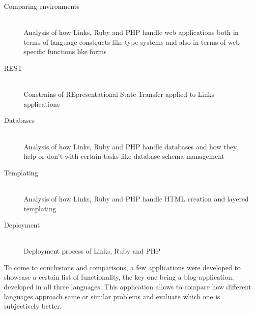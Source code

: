 \begin{description}
  \item[Comparing environments] \hfill \\
  Analysis of how Links, Ruby and PHP handle web applications both in terms of language constructs like type systems and also in terms of web-specific functions like forms
  \item[REST] \hfill \\
  Constrains of REpresentational State Transfer applied to Links applications
  \item[Databases] \hfill \\
  Analysis of how Links, Ruby and PHP handle databases and how they help or don't with certain tasks like database schema management
  \item[Templating] \hfill \\
  Analysis of how Links, Ruby and PHP handle HTML creation and layered templating
  \item[Deployment] \hfill \\
  Deployment process of Links, Ruby and PHP
\end{description}

To come to conclusions and comparisons, a few applications were developed to showcase a certain list of functionality, the key one being a blog application, developed in all three languages. This application allows to compare how different languages approach same or similar problems and evaluate which one is subjectively better. 